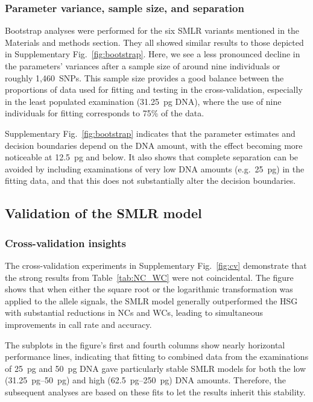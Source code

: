 \documentclass[preprint,5p,times,11pt]{elsarticle}
\begin{document}
\subsubsection{Parameter variance, sample size, and separation}
Bootstrap analyses were performed for the six SMLR variants mentioned in the Materials and methods section.
They all showed similar results to those depicted in Supplementary Fig.~\ref{fig:bootstrap}.
Here, we see a less pronounced decline in the parameters’ variances after a sample size of around nine individuals or roughly 1,460~SNPs.
This sample size provides a good balance between the proportions of data used for fitting and testing in the cross-validation, especially in the least populated examination (\SI{31.25}{\pg} DNA), where the use of nine individuals for fitting corresponds to 75\% of the data.

Supplementary Fig.~\ref{fig:bootstrap} indicates that the parameter estimates and decision boundaries depend on the DNA amount, with the effect becoming more noticeable at \SI{12.5}{\pg} and below.
It also shows that complete separation can be avoided by including examinations of very low DNA amounts (e.g.~\SI{25}{\pg}) in the fitting data, and that this does not substantially alter the decision boundaries.


\subsection{Validation of the SMLR model}
\subsubsection{Cross-validation insights}
The cross-validation experiments in Supplementary Fig.~\ref{fig:cv} demonstrate that the strong results from Table~\ref{tab:NC_WC} were not coincidental.
The figure shows that when either the square root or the logarithmic transformation was applied to the allele signals, the SMLR model generally outperformed the HSG with substantial reductions in NCs and WCs, leading to simultaneous improvements in call rate and accuracy.

The subplots in the figure's first and fourth columns show nearly horizontal performance lines, indicating that fitting to combined data from the examinations of \SI{25}{\pg} and \SI{50}{\pg} DNA gave particularly stable SMLR models for both the low (\SIrange[range-units = single, range-phrase = --]{31.25}{50}{\pg}) and high (\SIrange[range-units = single, range-phrase = --]{62.5}{250}{\pg}) DNA amounts.
Therefore, the subsequent analyses are based on these fits to let the results inherit this stability.
\end{document}
